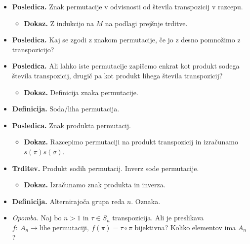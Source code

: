 \begin{enumerate}
\begin{itemize}
\begin{itemize}
            (2) Števili se pojavita v dveh različnih ciklih.
        \end{itemize}
        \item \colorbox{orange!30}{\textbf{Posledica.}} Znak permutacije v odvisnosti od števila transpozicij v razcepu.
        \begin{itemize}
            \item \colorbox{green!30}{\textbf{Dokaz.}} Z indukcijo na $M$ na podlagi prejšnje trditve.
        \end{itemize}
        \item \colorbox{orange!30}{\textbf{Posledica.}} Kaj se zgodi z znakom permutacije, če jo z desno pomnožimo z transpozicijo?
        \item \colorbox{orange!30}{\textbf{Posledica.}} Ali lahko iste permutacije zapišemo enkrat kot produkt sodega števila transpozicij, drugič pa kot produkt lihega števila transpozicij?
        \begin{itemize}
            \item \colorbox{green!30}{\textbf{Dokaz.}} Definicija znaka permutacije.
        \end{itemize}
        \item \colorbox{purple!30}{\textbf{Definicija.}} Soda/liha permutacija.
        \item \colorbox{orange!30}{\textbf{Posledica.}} Znak produkta permutacij.
        \begin{itemize}
            \item \colorbox{green!30}{\textbf{Dokaz.}} Razcepimo permutaciji na produkt transpozicij in izračunamo $s(\pi) s(\sigma)$.
        \end{itemize}
        \item \colorbox{blue!30}{\textbf{Trditev.}} Produkt sodih permutacij. Inverz sode permutacije.
        \begin{itemize}
            \item \colorbox{green!30}{\textbf{Dokaz.}} Izračunamo znak produkta in inverza.
        \end{itemize}
        \item \colorbox{purple!30}{\textbf{Definicija.}} Alternirajoča grupa reda $n$. Oznaka.
        \item \colorbox{yellow!30}{\emph{Opomba.}} Naj bo $n>1$ in $\tau \in S_n$ transpozicija. Ali je preslikava $f: \ A_n \to \text{lihe permutaciji}, \ f(\pi) = \tau \circ \pi$ bijektivna? Koliko elementov ima $A_n$?
    \end{itemize}


\end{enumerate}
